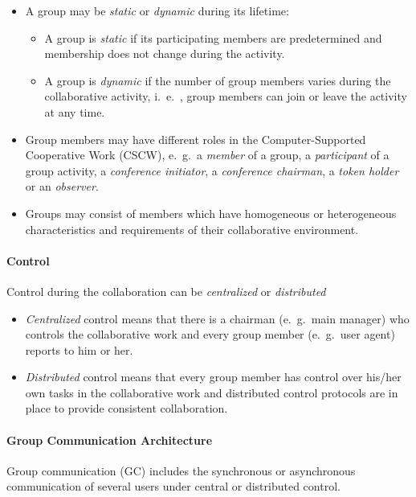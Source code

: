 \begin{itemize}
	\item A group may be \textit{static} or \textit{dynamic} during its lifetime:
	\begin{itemize}
		\item A group is \textit{static} if its participating members are predetermined and membership does not	change during the activity.
		\item A group is \textit{dynamic} if the number of group members varies during the collaborative activity, i.\ e.\ , group members can join or leave the activity at any time.
	\end{itemize}
	\item Group members may have different roles in the Computer-Supported Cooperative Work (CSCW), e.\ g.\ a \textit{member} of a group, a \textit{participant} of a group activity, a \textit{conference initiator}, a \textit{conference chairman}, a \textit{token holder} or an \textit{observer}.
	
	\item Groups may consist of members which have homogeneous or heterogeneous characteristics and requirements of their collaborative environment.
\end{itemize}

\paragraph*{Control}
 Control during the collaboration can be \textit{centralized} or \textit{distributed}
\begin{itemize}
	\item \textit{Centralized} control means that there is a chairman (e.\ g.\ main manager) who controls the collaborative work and every group member (e.\ g.\ user agent) reports to him or her. 
	
	\item \textit{Distributed} control means that every group member has control over his/her
	own tasks in the collaborative work and distributed control protocols are in place
	to provide consistent collaboration.
\end{itemize}

\paragraph{Group Communication Architecture}

Group communication (GC) includes the synchronous or asynchronous communication of several users under central or distributed control. 

